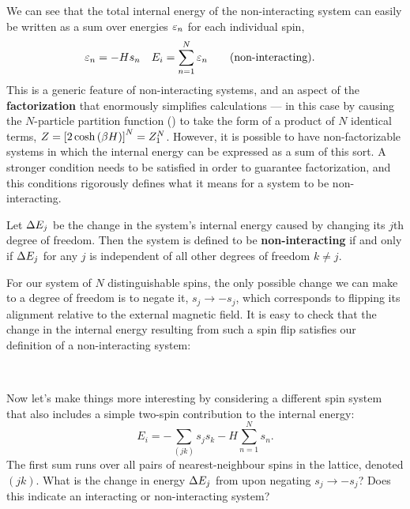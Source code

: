 We can see that the total internal energy of the non-interacting system can easily be written as a sum over energies $\varepsilon_n$ for each individual spin,
\begin{align*}
  \varepsilon_n & = -H s_n &
  E_i & = \sum_{n = 1}^N \varepsilon_n \qquad \mbox{(non-interacting)}.
\end{align*}
This is a generic feature of non-interacting systems, and an aspect of the \textbf{factorization} that enormously simplifies calculations --- in this case by causing the $N$-particle partition function () to take the form of a product of $N$ identical terms, $Z = \left[2\cosh\left(\beta H\right)\right]^N = Z_1^N$.
However, it is possible to have non-factorizable systems in which the internal energy can be expressed as a sum of this sort.
A stronger condition needs to be satisfied in order to guarantee factorization, and this conditions rigorously defines what it means for a system to be non-interacting.

\begin{shaded}
  Let $\Delta E_j$ be the change in the system's internal energy caused by changing its $j$th degree of freedom.
  Then the system is defined to be \textbf{non-interacting} if and only if $\Delta E_j$ for any $j$ is independent of all other degrees of freedom $k \ne j$.
\end{shaded}

For our system of $N$ distinguishable spins, the only possible change we can make to a degree of freedom is to negate it, $s_j \to -s_j$, which corresponds to flipping its alignment relative to the external magnetic field.
It is easy to check that the change in the internal energy resulting from such a spin flip satisfies our definition of a non-interacting system:
\begin{mdframed}
  \ \\[80 pt]
\end{mdframed}

Now let's make things more interesting by considering a different spin system that also includes a simple two-spin contribution to the internal energy:
\begin{equation}
  \label{eq:Ising_energy}
  E_i = -\sum_{(jk)} s_j s_k - H \sum_{n = 1}^N s_n.
\end{equation}
The first sum runs over all pairs of nearest-neighbour spins in the lattice, denoted $(jk)$.
What is the change in energy $\Delta E_j$ from  upon negating $s_j \to -s_j$?
Does this indicate an interacting or non-interacting system?
\begin{mdframed}
  \ \\[100 pt]
\end{mdframed}

